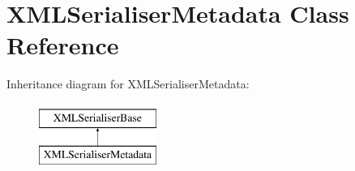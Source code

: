 \hypertarget{class_x_m_l_serialiser_metadata}{}\section{X\+M\+L\+Serialiser\+Metadata Class Reference}
\label{class_x_m_l_serialiser_metadata}
Inheritance diagram for X\+M\+L\+Serialiser\+Metadata\+:\begin{figure}[H]
\begin{center}
\leavevmode
\includegraphics[height=2.000000cm]{class_x_m_l_serialiser_metadata}
\end{center}
\end{figure}
